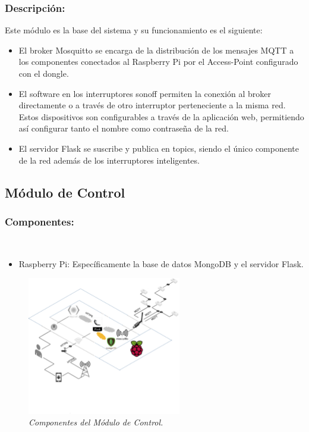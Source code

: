 \subsubsection{Descripción:}

Este módulo es la base del sistema y su funcionamiento es el siguiente:

\begin{itemize}

\item El broker Mosquitto se encarga de la distribución de los mensajes MQTT a los componentes conectados al Raspberry Pi por el Access-Point configurado con el dongle.

\item El software en los interruptores sonoff permiten la conexión al broker directamente o a través de otro interruptor perteneciente a la misma red. Estos dispositivos son configurables a través de la aplicación web, permitiendo así configurar tanto el nombre como contraseña de la red.

\item El servidor Flask se suscribe y publica en topics, siendo el único componente de la red además de los interruptores inteligentes.

\end{itemize}


\subsection{Módulo de Control}

\subsubsection{Componentes:} ~

\begin{itemize}

\item Raspberry Pi: Específicamente la base de datos MongoDB y el servidor Flask.

\end{itemize}

\begin{figure}[h]
  \centering
  \includegraphics[width=0.6\textwidth, keepaspectratio]{images/mod-ctrl}
  \caption{\textit{Componentes del Módulo de Control.}}
  \label{fig:mod-ctrl-comp}
\end{figure}

